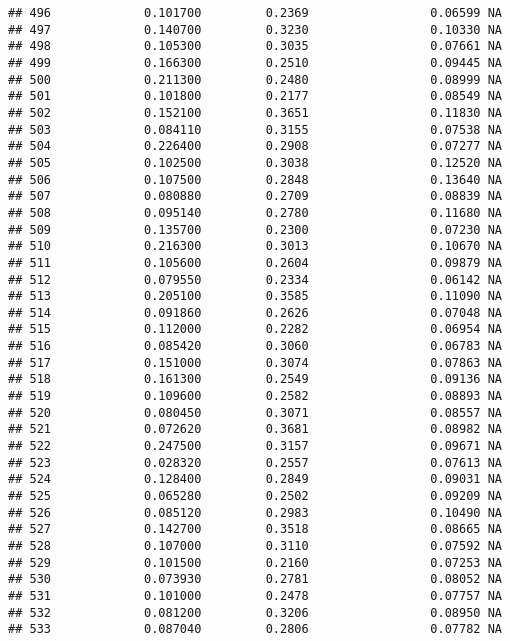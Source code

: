 \documentclass[
]{article}
\begin{document}
\begin{verbatim}
## 496             0.101700         0.2369                 0.06599 NA
## 497             0.140700         0.3230                 0.10330 NA
## 498             0.105300         0.3035                 0.07661 NA
## 499             0.166300         0.2510                 0.09445 NA
## 500             0.211300         0.2480                 0.08999 NA
## 501             0.101800         0.2177                 0.08549 NA
## 502             0.152100         0.3651                 0.11830 NA
## 503             0.084110         0.3155                 0.07538 NA
## 504             0.226400         0.2908                 0.07277 NA
## 505             0.102500         0.3038                 0.12520 NA
## 506             0.107500         0.2848                 0.13640 NA
## 507             0.080880         0.2709                 0.08839 NA
## 508             0.095140         0.2780                 0.11680 NA
## 509             0.135700         0.2300                 0.07230 NA
## 510             0.216300         0.3013                 0.10670 NA
## 511             0.105600         0.2604                 0.09879 NA
## 512             0.079550         0.2334                 0.06142 NA
## 513             0.205100         0.3585                 0.11090 NA
## 514             0.091860         0.2626                 0.07048 NA
## 515             0.112000         0.2282                 0.06954 NA
## 516             0.085420         0.3060                 0.06783 NA
## 517             0.151000         0.3074                 0.07863 NA
## 518             0.161300         0.2549                 0.09136 NA
## 519             0.109600         0.2582                 0.08893 NA
## 520             0.080450         0.3071                 0.08557 NA
## 521             0.072620         0.3681                 0.08982 NA
## 522             0.247500         0.3157                 0.09671 NA
## 523             0.028320         0.2557                 0.07613 NA
## 524             0.128400         0.2849                 0.09031 NA
## 525             0.065280         0.2502                 0.09209 NA
## 526             0.085120         0.2983                 0.10490 NA
## 527             0.142700         0.3518                 0.08665 NA
## 528             0.107000         0.3110                 0.07592 NA
## 529             0.101500         0.2160                 0.07253 NA
## 530             0.073930         0.2781                 0.08052 NA
## 531             0.101000         0.2478                 0.07757 NA
## 532             0.081200         0.3206                 0.08950 NA
## 533             0.087040         0.2806                 0.07782 NA

\end{verbatim}
\end{document}
